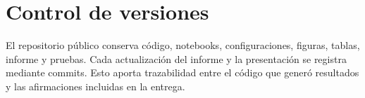 \section{Control de versiones}
El repositorio público conserva código, notebooks, configuraciones, figuras, tablas, informe y pruebas. Cada actualización del informe y la presentación se registra mediante commits. Esto aporta trazabilidad entre el código que generó resultados y las afirmaciones incluidas en la entrega.
